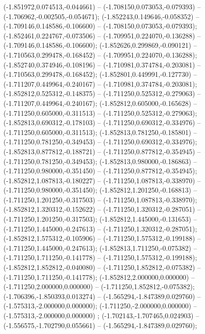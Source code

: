  (-1.851972,0.074513,-0.044661) -- (-1.708150,0.073053,-0.079393) -- (-1.706962,-0.002505,-0.054671);
 (-1.852243,0.149646,-0.058352) -- (-1.709146,0.148586,-0.106600) -- (-1.708150,0.073053,-0.079393);
 (-1.852461,0.224767,-0.073506) -- (-1.709951,0.224070,-0.136288) -- (-1.709146,0.148586,-0.106600);
 (-1.852626,0.299869,-0.090121) -- (-1.710563,0.299478,-0.168452) -- (-1.709951,0.224070,-0.136288);
 (-1.852740,0.374946,-0.108196) -- (-1.710981,0.374784,-0.203081) -- (-1.710563,0.299478,-0.168452);
 (-1.852801,0.449991,-0.127730) -- (-1.711207,0.449964,-0.240167) -- (-1.710981,0.374784,-0.203081);
 (-1.852812,0.525312,-0.148375) -- (-1.711250,0.525312,-0.279063) -- (-1.711207,0.449964,-0.240167);
 (-1.852812,0.605000,-0.165628) -- (-1.711250,0.605000,-0.311513) -- (-1.711250,0.525312,-0.279063);
 (-1.852813,0.690312,-0.178103) -- (-1.711250,0.690312,-0.334976) -- (-1.711250,0.605000,-0.311513);
 (-1.852813,0.781250,-0.185801) -- (-1.711250,0.781250,-0.349453) -- (-1.711250,0.690312,-0.334976);
 (-1.852813,0.877812,-0.188721) -- (-1.711250,0.877812,-0.354945) -- (-1.711250,0.781250,-0.349453);
 (-1.852813,0.980000,-0.186863) -- (-1.711250,0.980000,-0.351450) -- (-1.711250,0.877812,-0.354945);
 (-1.852812,1.087813,-0.180227) -- (-1.711250,1.087813,-0.338970) -- (-1.711250,0.980000,-0.351450);
 (-1.852812,1.201250,-0.168813) -- (-1.711250,1.201250,-0.317503) -- (-1.711250,1.087813,-0.338970);
 (-1.852812,1.320312,-0.152622) -- (-1.711250,1.320312,-0.287051) -- (-1.711250,1.201250,-0.317503);
 (-1.852812,1.445000,-0.131653) -- (-1.711250,1.445000,-0.247613) -- (-1.711250,1.320312,-0.287051);
 (-1.852812,1.575312,-0.105906) -- (-1.711250,1.575312,-0.199188) -- (-1.711250,1.445000,-0.247613);
 (-1.852813,1.711250,-0.075382) -- (-1.711250,1.711250,-0.141778) -- (-1.711250,1.575312,-0.199188);
 (-1.852812,1.852812,-0.040080) -- (-1.711250,1.852812,-0.075382) -- (-1.711250,1.711250,-0.141778);
 (-1.852812,2.000000,0.000000) -- (-1.711250,2.000000,0.000000) -- (-1.711250,1.852812,-0.075382);
 (-1.706396,-1.850393,0.013274) -- (-1.565294,-1.847389,0.029760) -- (-1.575313,-2.000000,0.000000);
 (-1.711250,-2.000000,0.000000) -- (-1.575313,-2.000000,0.000000) ;
 (-1.702143,-1.707465,0.024903) -- (-1.556575,-1.702790,0.055661) -- (-1.565294,-1.847389,0.029760);
